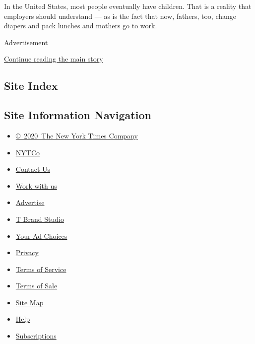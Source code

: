 In the United States, most people eventually have children. That is a
reality that employers should understand --- as is the fact that now,
fathers, too, change diapers and pack lunches and mothers go to work.

Advertisement

\protect\hyperlink{after-bottom}{Continue reading the main story}

\hypertarget{site-index}{%
\subsection{Site Index}\label{site-index}}

\hypertarget{site-information-navigation}{%
\subsection{Site Information
Navigation}\label{site-information-navigation}}

\begin{itemize}
\tightlist
\item
  \href{https://help.nytimes3xbfgragh.onion/hc/en-us/articles/115014792127-Copyright-notice}{©~2020~The
  New York Times Company}
\end{itemize}

\begin{itemize}
\tightlist
\item
  \href{https://www.nytco.com/}{NYTCo}
\item
  \href{https://help.nytimes3xbfgragh.onion/hc/en-us/articles/115015385887-Contact-Us}{Contact
  Us}
\item
  \href{https://www.nytco.com/careers/}{Work with us}
\item
  \href{https://nytmediakit.com/}{Advertise}
\item
  \href{http://www.tbrandstudio.com/}{T Brand Studio}
\item
  \href{https://www.nytimes3xbfgragh.onion/privacy/cookie-policy\#how-do-i-manage-trackers}{Your
  Ad Choices}
\item
  \href{https://www.nytimes3xbfgragh.onion/privacy}{Privacy}
\item
  \href{https://help.nytimes3xbfgragh.onion/hc/en-us/articles/115014893428-Terms-of-service}{Terms
  of Service}
\item
  \href{https://help.nytimes3xbfgragh.onion/hc/en-us/articles/115014893968-Terms-of-sale}{Terms
  of Sale}
\item
  \href{https://spiderbites.nytimes3xbfgragh.onion}{Site Map}
\item
  \href{https://help.nytimes3xbfgragh.onion/hc/en-us}{Help}
\item
  \href{https://www.nytimes3xbfgragh.onion/subscription?campaignId=37WXW}{Subscriptions}
\end{itemize}
